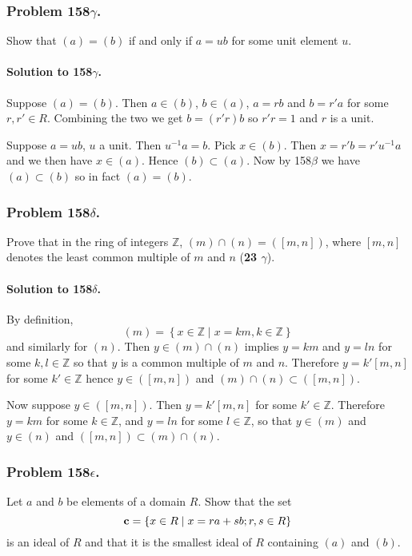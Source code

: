 \subsubsection{Problem 158$\gamma$.}
Show that $(a) = (b)$ if and only if $a = ub$ for some unit element $u$.

\paragraph*{Solution to 158$\gamma$.}
Suppose $(a) = (b)$. Then $a \in (b)$, $b \in (a)$, $a = rb$ and $ b = r'a$ for
some $ r, r' \in R$. Combining the two we get $ b = (r'r)b$ so $r'r = 1$ and $
r $ is a unit.

Suppose $ a = ub$, $u$ a unit. Then $ u^{-1}a = b$. Pick $ x \in (b)$. Then $ x
= r'b = r' u^{-1} a$ and we then have $ x \in (a) $. Hence $ (b) \subset (a)$.
Now by 158$\beta$ we have $ (a) \subset (b) $ so in fact $ (a) = (b) $.

\subsubsection{Problem 158$\delta$.}
Prove that in the ring of integers $\mathbb{Z}$, $(m) \cap (n) = ([m,n])$,
where $[m,n]$ denotes the least common multiple of $m$ and $n$ (\textbf{23
$\gamma$}).

\paragraph*{Solution to 158$\delta$.}
By definition, $$ (m) = \left\{ x \in \mathbb{Z} \mid x = km, k \in \mathbb{Z}
\right\} $$ and similarly for $(n)$. Then $ y \in (m) \cap (n) $ implies $ y =
km $ and $y = ln $ for some $k, l \in \mathbb{Z}$ so that $y$ is a common
multiple of $m$ and $n$. Therefore $ y = k'[m,n]$ for some $k' \in \mathbb{Z}$
hence $ y \in ([m,n])$ and $(m) \cap (n) \subset ([m,n])$.

Now suppose $ y \in ([m,n])$. Then $ y = k'[m,n] $ for some $k' \in
\mathbb{Z}$.  Therefore $ y = km $ for some $k\in \mathbb{Z}$, and $ y = ln $
for some $l \in \mathbb{Z}$, so that $ y \in (m) $ and $ y \in (n)$ and
$([m,n]) \subset (m) \cap (n)$.

\subsubsection{Problem 158$\epsilon$.}
Let $a$ and $b$ be elements of a domain $R$. Show that the set $$ \mathsf{\mathbf{c}} =
\left\{ x \in R \mid x = ra + sb; r, s \in R \right\} $$ is an ideal of $R$ and
that it is the smallest ideal of $R$ containing $(a)$ and $(b)$.

